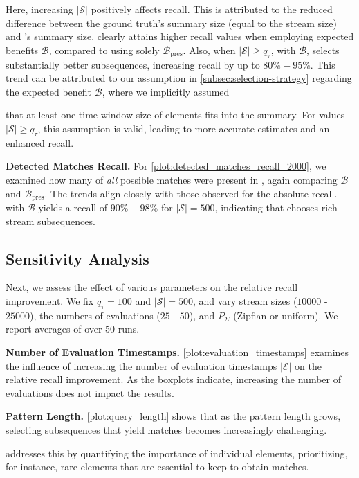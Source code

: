 Here, increasing $|\mathcal{S}|$ positively affects
recall. This
is attributed to the reduced difference between the ground
truth's summary size (equal to the stream size) and \suse{}'s summary size.
\suse{} clearly attains higher recall values when employing expected
benefits $\mathcal{B}$,
compared to using solely
$\mathcal{B}_{\text{pres}}$. Also, when
$|\mathcal{S}| \geq q_\tau$, with $\mathcal{B}$, \suse{} selects
substantially better subsequences, increasing recall by
up to $80\%-95\%$. This trend can be attributed to our assumption in
\autoref{subsec:selection-strategy} regarding the expected benefit
$\mathcal{B}$, where we implicitly assumed

that at least one time window size of elements fits into the summary. For
values $|\mathcal{S}| \geq q_\tau$, this assumption is valid, leading to more
accurate estimates and an enhanced recall.


\textbf{Detected Matches Recall.} For
\autoref{plot:detected_matches_recall_2000}, we examined how many of \emph{all}
possible matches were present in \suse{}, again comparing $\mathcal{B}$ and
$\mathcal{B}_{\text{pres}}$. The trends align closely with those observed for
the absolute recall. \suse{} with $\mathcal{B}$ yields a recall
of $90\%-98\%$ for $|\mathcal{S}| = 500$, indicating that \suse{}
chooses rich stream subsequences.

\subsection{Sensitivity Analysis}
\label{subsec:sensitivity-analysis}
Next, we assess the effect of various parameters on the relative recall
improvement. We fix $q_\tau = 100$ and $|\mathcal{S}| = 500$, and vary
stream sizes ($10000$ - $25000$), the numbers of evaluations
($25$ - $50$), and $P_\Sigma$ (Zipfian or uniform). We report
averages of over $50$ runs.

\textbf{Number of Evaluation Timestamps.}
\autoref{plot:evaluation_timestamps} examines the influence of increasing the number of evaluation timestamps $|\mathcal{E}|$ on the relative recall improvement. As the boxplots indicate, increasing the number of evaluations does not impact the results.

\textbf{Pattern Length.} \autoref{plot:query_length} shows that as the pattern
length grows, selecting
subsequences that yield matches becomes increasingly challenging.

\suse{} addresses this by quantifying the importance of individual elements,
prioritizing, for instance, rare elements that are essential to keep to obtain
matches.

